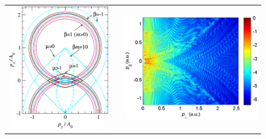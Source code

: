 \newlength{\figuresixMheight}
\setlength{\figuresixMheight}{6cm}
\begin{figure}[htb]
  \centering
  \subfigure{\label{f6-becker-circles-original-figure-a}}
  \subfigure{\label{f6-becker-circles-original-figure-b}}
  \begin{tabular}{ccc}
  \includegraphics[height=\figuresixMheight]{6-LES/Figures/figure6Ma.jpg}
  & & 
  \includegraphics[height=\figuresixMheight]{6-LES/Figures/figure6Mb.jpg}

\end{tabular}
\end{figure}
